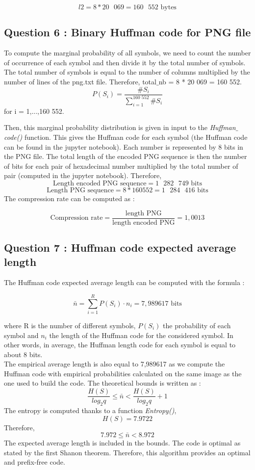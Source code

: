 \documentclass[titlepage]{article}
\begin{document}
$$l2 = 8 * 20 \text{ } 069 = 160\text{ }552 \text{ bytes} $$
 
\subsection{Question 6 : Binary Huffman code for PNG file }

To compute the marginal probability of all symbols, we need to count the number of occurrence of each symbol and then divide it by the total number of symbols. The total number of symbols is equal to the number of columns multiplied by the number of lines of the png.txt file. Therefore, total$\_$nb = 8 * 20 069 = 160 552.
$$ P(S_i) = \frac{\#S_i}{\sum^\text{160 552}_{i=1}\#S_i}$$ for i = 1,...,160 552.

Then, this marginal probability distribution is given in input to the \textit{Huffman$\_$code()} function. This gives the Huffman code for each symbol (the Huffman code can be found in the jupyter notebook). Each number is represented by 8 bits in the PNG file. The total length of the encoded PNG sequence is then the number of bits for each pair of hexadecimal number multiplied by the total number of pair (computed in the jupyter notebook). Therefore, 
$$ \text{Length encoded PNG sequence} = 1 \text{ } 282 \text{ } 749 \text{ bits}$$
$$ \text{Length PNG sequence} = 8 * 160 552 = 1 \text{ } 284 \text{ } 416 \text{ bits}$$
The compression rate can be computed as : 

$$ \text{Compression rate} = \frac{\text{length PNG}}{\text{length encoded PNG}} = 1,0013$$

\subsection{Question 7 : Huffman code expected average length}
The Huffman code expected average length can be computed with the formula : 

$$\bar{n}=\sum_{i=1}^R P\left(S_i\right) \cdot n_i= 7,989617 \text{ bits}$$

where R is the number of different symbols, $P(S_i)$ the probability of each symbol and $n_i$ the length of the Huffman code for the considered symbol. In other words, in average, the Huffman length code for each symbol is equal to about 8 bits. \\

The empirical average length is also equal to 7,989617 as we compute the Huffman code with empirical probabilities calculated on the same image as the one used to build the code. The theoretical bounds is written as : 
$$ \frac{H(S)}{log_2 q} \leq \bar{n} < \frac{H(S)}{log_2 q} + 1$$
The entropy is computed thanks to a function \textit{Entropy()}, 
$$H(S) = 7.9722$$
Therefore, 
$$ 7.972 \leq \bar{n} < 8.972$$
The expected average length is included in the bounds. The code is optimal as stated by the first Shanon theorem. Therefore,  this algorithm provides an optimal and prefix-free code. 
\end{document}
